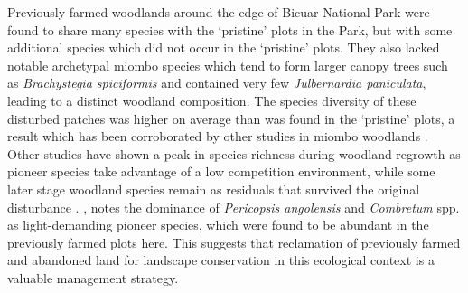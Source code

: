 \begin{refsection}
Previously farmed woodlands around the edge of Bicuar National Park were found to share many species with the `pristine' plots in the Park, but with some additional species which did not occur in the `pristine' plots. They also lacked notable archetypal miombo species which tend to form larger canopy trees such as \textit{Brachystegia spiciformis} and contained very few \textit{Julbernardia paniculata}, leading to a distinct woodland composition. The species diversity of these disturbed patches was higher on average than was found in the `pristine' plots, a result which has been corroborated by other studies in miombo woodlands \citep{Caro2001, McNicol2018b, Shackleton2000}. Other studies have shown a peak in species richness during woodland regrowth as pioneer species take advantage of a low competition environment, while some later stage woodland species remain as residuals that survived the original disturbance \citep{Goncalves2017, Kalaba2013}. \citet{Goncalves2017}, notes the dominance of \textit{Pericopsis angolensis} and \textit{Combretum} spp. as light-demanding pioneer species, which were found to be abundant in the previously farmed plots here. This suggests that reclamation of previously farmed and abandoned land for landscape conservation in this ecological context is a valuable management strategy.


\end{refsection}
